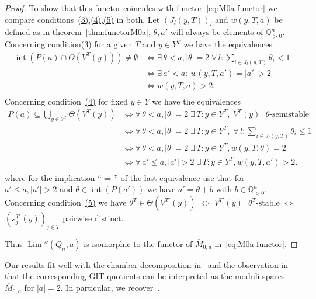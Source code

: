 \documentclass[ALCO,ThmDefs,Unicode,epreuves]{cedram}
\def\Q{\mathds Q}
\DeclareMathOperator{\interior}{int}
\DeclareMathOperator{\Lim}{Lim}
\begin{document}
\begin{proof}
To show that this functor coincides with functor~\eqref{eq:M0a-functor}
we compare conditions~\hyperlink{ancretroisp}{(3)},\hyperlink{ancrequatrep}{(4)},\hyperlink{ancrecinqp}{(5)} in both. 
Let $(J_l(y,T))_l$ and $w(y,T,a)$ be defined as 
in theorem~\ref{thm:functorM0a}, $\theta,a'$ will always 
be elements of $\Q_{>0}^n$.
Concerning condition\hyperlink{ancretroisp}{(3)} for a given $T$ and $y\in Y^T$ we have the equivalences
\[ 
\begin{aligned}
\interior(P(a)\cap \Theta(V^T(y)))\neq\emptyset
&\textstyle \Longleftrightarrow 
\exists\,\theta<a,|\theta|=2\;
\forall\,l\colon\sum\nolimits_{i\in J_l(y,T)}\theta_i<1\\
&\Longleftrightarrow 
\exists\,a'<a\colon\:w(y,T,a')=|a'|>2\\
&\Longleftrightarrow 
w(y,T,a)>2.\\
\end{aligned}
\]
Concerning condition~\hyperlink{ancrequatrep}{(4)} for fixed $y\in Y$ we have the equivalences
\[
\begin{aligned}
P(a)\subseteq\bigcup\nolimits_{y\in Y^T}\Theta(V^T(y))
&\Longleftrightarrow
\forall\,\theta<a,|\theta|=2\;\exists\,T\colon y\in Y^T,\;
\text{$V^T(y)$ $\theta$-semistable}\\
&\textstyle \Longleftrightarrow
\forall\,\theta<a,|\theta|=2\;\exists\,T\colon y\in Y^T,\; 
\forall\, l\colon\sum\nolimits_{i\in J_l(y,T)}\theta_i\leq 1\\
&\Longleftrightarrow
\forall\,\theta<a,|\theta|=2\;\exists\,T\colon y\in Y^T,w(y,T,\theta)=2\\
&\Longleftrightarrow
\forall\,a'\leq a,|a'|>2\;\exists\,T\colon y\in Y^T,w(y,T,a')>2.\\
\end{aligned}
\]
where for the implication ``$\Longrightarrow$''{} of the last equivalence
use that for $a'\leq a,|a'|>2$ and $\theta\in\interior(P(a'))$ we have
$a'=\theta+b$ with $b\in\Q_{>0}^n$.
Concerning condition~\hyperlink{ancrecinqp}{(5)} we have $\theta^T\!\!\in \Theta(V^{T'}\!(y))$
$\Longleftrightarrow$ $\text{$V^{T'}(y)$ $\theta^T$-stable}$
$\Longleftrightarrow$ $\text{$(s^{T'}_j(y))_{j\in T}$ pairwise distinct}$.

Thus $\Lim''(Q_n,a)$ is isomorphic to the functor of $\overline{M}_{0,a}$ 
in~\eqref{eq:M0a-functor}.
\end{proof}

\begin{rema}
Our results fit well with the chamber decomposition in~\cite[section~5]{Ha03} 
and the observation in~\cite[section~8]{Ha03} that the corresponding GIT quotients
can be interpreted as the moduli spaces $\overline{M}_{0,a}$ for $|a|=2$.
In particular, we recover~\cite[Theorem~8.2, Theorem~8.3]{Ha03}.
\end{rema}




\end{document}
